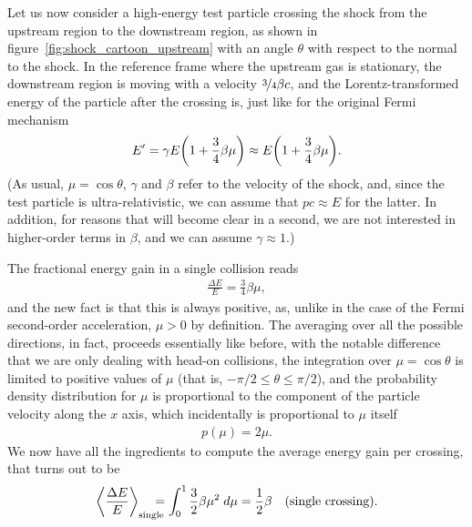 \begin{marginfigure}
  
  \caption{Schematic view of a parallel shock in the reference frame where the
  velocity distribution for the upstream gas is isotropic.}
  \label{fig:shock_cartoon_upstream}
\end{marginfigure}

Let us now consider a high-energy test particle crossing the shock from the upstream
region to the downstream region, as shown in figure~\ref{fig:shock_cartoon_upstream}
with an angle $\theta$ with respect to the normal to the shock. In the reference
frame where the upstream gas is stationary, the downstream region is moving with
a velocity $\nicefrac{3}{4} \beta c$, and the Lorentz-transformed energy of the
particle after the crossing is, just like for the original Fermi mechanism
\begin{align*}
  E' = \gamma E \qty(1 + \frac{3}{4}\beta \mu) \approx
  E \qty(1 + \frac{3}{4}\beta \mu).
\end{align*}
(As usual, $\mu = \cos\theta$, $\gamma$ and $\beta$ refer to the velocity of the shock,
and, since the test particle is ultra-relativistic, we can assume that $pc \approx E$
for the latter. In addition, for reasons that will become clear in a second, we
are not interested in higher-order terms in $\beta$, and we can assume $\gamma \approx 1$.)

The fractional energy gain in a single collision reads
\begin{align*}
  \frac{\Delta E}{E} = \frac{3}{4} \beta \mu,
\end{align*}
and the new fact is that this is always positive, as, unlike in the case of the
Fermi second-order acceleration, $\mu > 0$ by definition. The averaging over
all the possible directions, in fact, proceeds essentially like before, with the
notable difference that we are only dealing with head-on collisions, the integration
over $\mu = \cos\theta$ is limited to positive values of $\mu$ (that is,
$-\pi/2 \leq \theta \leq \pi/2$), and the probability density distribution for $\mu$
is proportional to the component of the particle velocity along the $x$ axis,
which incidentally is proportional to $\mu$ itself
\begin{align*}
  p(\mu) = 2 \mu.
\end{align*}
We now have all the ingredients to compute the average energy gain per crossing, that
turns out to be
\begin{align}
  \left<\frac{\Delta E}{E}\right>_\text{single} \!\!\!\!\!\! =
  \int_0^{1} \frac{3}{2} \beta \mu^2 \;d{\mu} =
  \frac{1}{2} \beta \quad\text{(single crossing)}.
\end{align}

